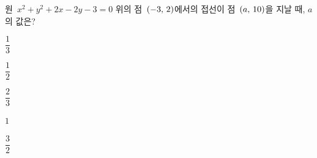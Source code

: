 원~$x^2+y^2+2x-2y-3=0$ 위의 점~$(-3,\mkern3mu 2)$에서의 접선이 점~$(a,\mkern3mu 10)$을 지날 때, $a$의 값은?
\begin{choices32}{\rule[-3ex]{0pt}{8ex}$\dfrac{1}{3}$}{\rule[-3ex]{0pt}{8ex}$\dfrac{1}{2}$}{\rule[-3ex]{0pt}{8ex}$\dfrac{2}{3}$}{\rule[-3ex]{0pt}{8ex}$1$}{\rule[-3ex]{0pt}{8ex}$\dfrac{3}{2}$}\end{choices32}
